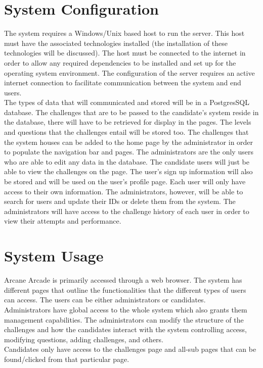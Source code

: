 \documentclass[english]{article}
\begin{document}
	\section{System Configuration}
	The system requires a Windows/Unix based host to run the server. This
host must have the associated technologies installed (the installation of these
technologies will be discussed). The host must be connected to the
internet in order to allow any required dependencies to be installed and set
up for the operating system environment. The configuration of the server
requires an active internet connection to facilitate communication between the
system and end users.
	\\[12pt]
 The types of data that will communicated and stored will be in a PostgresSQL database. The challenges that are to be passed to the candidate's system reside in the database, there will have to be retrieved for display in the pages. The levels and questions that the challenges entail will be stored too. The challenges that the system houses can be added to
the home page by the administrator in order to populate the navigation bar and pages. The administrators are the only users who are able to  edit any data in the database.
\newpage
 The candidate users will just be able to view the challenges on the page. The user's sign up information will also be stored and will be used on the user's profile page. Each user will only have access to their own information. The administrators, however, will be able to search for users and update their IDs or delete them from the system. The administrators will have access to the challenge history of each user in order to view their attempts and performance.

	
	
	\section{System Usage}
	Arcane Arcade is primarily accessed through a web browser. The system has different pages that outline the functionalities that the different types of users can access. The users can be either administrators or candidates. 
		\\[12pt]
	Administrators have global access to the whole system which also grants them management capabilities. The administrators can modify the structure of the challenges and how the candidates interact with the system controlling access, modifying questions, adding challenges, and others.
		\\[12pt]
	Candidates only have access to the challenges page and all-sub pages that can be found/clicked from that particular page.
	
\end{document}

